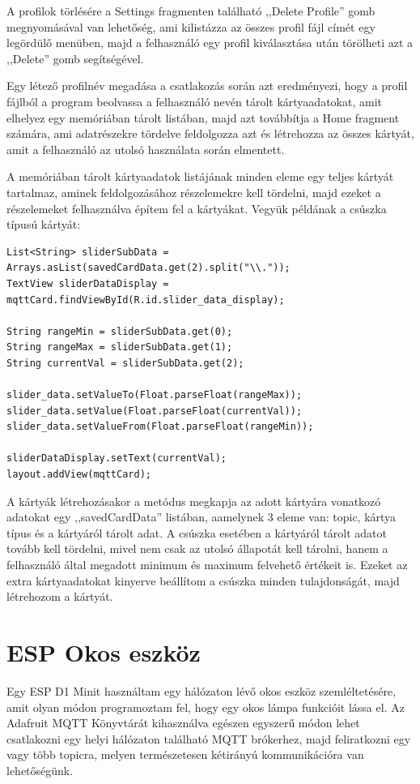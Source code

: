 \documentclass[]{thesis-ekf}
\theoremstyle{definition}
\theoremstyle{remark}
\begin{document}
A profilok törlésére a Settings fragmenten található ,,Delete Profile'' gomb megnyomásával van lehetőség,
ami kilistázza az összes profil fájl címét egy legördülő menüben, majd a felhasználó egy profil kiválasztása után
törölheti azt a ,,Delete'' gomb segítségével.

Egy létező profilnév megadása a csatlakozás során azt eredményezi, hogy a profil fájlból a program beolvassa a felhasználó nevén
tárolt kártyaadatokat, amit elhelyez egy memóriában tárolt listában, majd azt továbbítja a Home fragment számára, ami
adatrészekre tördelve feldolgozza azt és létrehozza az összes kártyát, amit a felhasználó az utolsó használata során
elmentett.

A memóriában tárolt kártyaadatok listájának minden eleme egy teljes kártyát tartalmaz, aminek feldolgozásához részelemekre
kell tördelni, majd ezeket a részelemeket felhasználva építem fel a kártyákat. Vegyük példának a csúszka típusú kártyát:

\lstset{language=Java}
\begin{lstlisting}[frame=single]
List<String> sliderSubData = Arrays.asList(savedCardData.get(2).split("\\."));
TextView sliderDataDisplay = mqttCard.findViewById(R.id.slider_data_display);

String rangeMin = sliderSubData.get(0);
String rangeMax = sliderSubData.get(1);
String currentVal = sliderSubData.get(2);

slider_data.setValueTo(Float.parseFloat(rangeMax));
slider_data.setValue(Float.parseFloat(currentVal));
slider_data.setValueFrom(Float.parseFloat(rangeMin));

sliderDataDisplay.setText(currentVal);
layout.addView(mqttCard);
\end{lstlisting}

A kártyák létrehozásakor a metódus megkapja az adott kártyára vonatkozó adatokat egy ,,savedCardData'' listában, aamelynek
3 eleme van: topic, kártya típus és a kártyáról tárolt adat. A csúszka esetében a kártyáról tárolt adatot tovább kell tördelni,
mivel nem csak az utolsó állapotát kell tárolni, hanem a felhasználó által megadott minimum és maximum felvehető értékeit is.
Ezeket az extra kártyaadatokat kinyerve beállítom a csúszka minden tulajdonságát, majd létrehozom a kártyát.

\section{ESP Okos eszköz}
Egy ESP D1 Minit használtam egy hálózaton lévő okos eszköz szemléltetésére, amit olyan módon programoztam fel, hogy egy
okos lámpa funkcióit lássa el. Az Adafruit MQTT Könyvtárát\cite{adafruit} kihasználva egészen egyszerű módon lehet csatlakozni
egy helyi hálózaton található MQTT brókerhez, majd feliratkozni egy vagy több topicra, melyen természetesen kétirányú
kommunikációra van lehetőségünk. 
\end{document}
